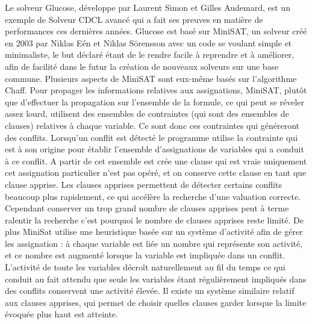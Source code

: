 \documentclass[a4paper,11pt]{article}
\begin{document}
Le solveur Glucose, développe par Laurent Simon et Gilles Audemard, est un exemple de Solveur CDCL avancé qui a fait ses preuves en matière de performances ces dernières années.
Glucose est basé sur MiniSAT, un solveur créé en 2003 par Niklas Eén et Niklas Sörensson avec un code se voulant simple et minimaliste, le but déclaré étant de le rendre facile à reprendre et à améliorer, 
afin de facilité dans le futur la création de nouveaux solveurs sur une base commune. Plusieurs aspects de MiniSAT sont eux-même basés sur l'algorithme Chaff. Pour propager les informations relatives aux assignations, 
MiniSAT, plutôt que d'effectuer la propagation sur l'ensemble de la formule, ce qui peut se réveler assez lourd, utilisent des ensembles de contraintes (qui sont des ensembles de clauses) relatives à chaque variable. 
Ce sont donc ces contraintes qui généreront des conflits. Lorsqu'un conflit est détecté le programme utilise la contrainte qui est à son origine pour établir l'ensemble d'assignations de variables qui a conduit 
à ce conflit. A partir de cet ensemble est crée une clause qui est vraie uniquement cet assignation particulier n'est pas opéré, et on conserve cette clause en tant que clause apprise. Les clauses apprises 
permettent de détecter certains conflits beaucoup plus rapidement, ce qui accélère la recherche d'une valuation correcte. Cependant conserver un trop grand nombre de clauses apprises peut à terme ralentir la recherche 
c'est pourquoi le nombre de clauses apprises reste limité. De plus MiniSat utilise une heuristique basée sur un système d'activité afin de gérer les assignation : à chaque variable est liée un nombre qui représente son activité, et 
ce nombre est augmenté lorsque la variable est impliquée dans un conflit. L'activité de toute les variables décroît naturellement au fil du temps ce qui conduit au fait attendu que seule les variables étant régulièrement 
impliqués dans des conflits conservent une activité élevée. Il existe un système similaire relatif aux clauses apprises, qui permet de choisir quelles clauses garder lorsque la limite évoquée plus haut est atteinte. 
\end{document}
